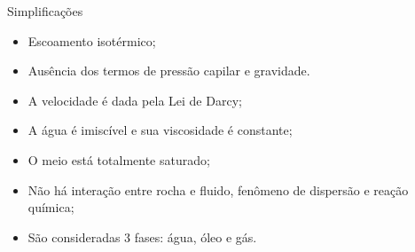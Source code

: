 \documentclass[professionalfont]{beamer}
\begin{document}
\begin{frame}{Simplificações}
    \begin{itemize}
        \item Escoamento isotérmico;
        \item Ausência dos termos de pressão capilar e gravidade.
        \item A velocidade é dada pela Lei de Darcy;
        \item A água é imiscível e sua viscosidade é constante;
        \item O meio está totalmente saturado;
        \item Não há interação entre rocha e fluido, fenômeno de dispersão e reação química;
        \item São consideradas 3 fases: água, óleo e gás.
    \end{itemize}
    
\end{frame}
\end{document}
